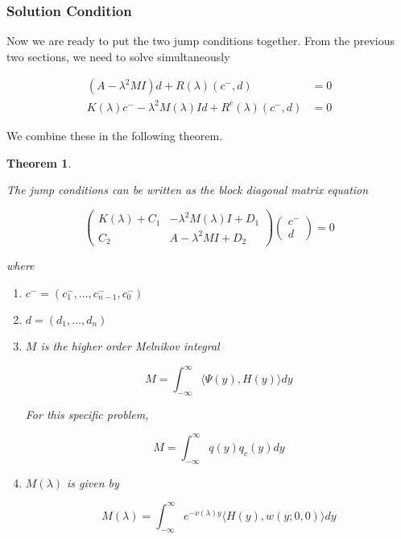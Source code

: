 \documentclass[12pt]{article}
\newtheorem{theorem}{Theorem}
\begin{document}
\subsubsection{Solution Condition}

Now we are ready to put the two jump conditions together. From the previous two sections, we need to solve simultaneously

\begin{align*}
(A - \lambda^2 MI)d + R(\lambda)(c^-,d) &= 0 \\
K(\lambda)c^- -\lambda^2 M(\lambda) I d + R^c(\lambda)(c^-,d) &= 0
\end{align*}

We combine these in the following theorem.

\begin{theorem}\label{blockmatrixform}

The jump conditions can be written as the block diagonal matrix equation 

\begin{equation}
\begin{pmatrix}
K(\lambda) + C_1 & -\lambda^2 M(\lambda) I + D_1 \\
C_2 & A - \lambda^2 MI + D_2
\end{pmatrix}
\begin{pmatrix}c^- \\ d \end{pmatrix} = 0
\end{equation}

where 

\begin{enumerate}
\item $c^- = (c_1^-, \dots, c_{n-1}^-, c_0^-)$
\item $d = (d_1, \dots, d_n)$
\item $M$ is the higher order Melnikov integral

\begin{equation}
M =  \int_{-\infty}^\infty \langle \Psi(y), H(y) \rangle dy
\end{equation}

For this specific problem,

\begin{equation*}
M =  \int_{-\infty}^\infty q(y) q_c(y) dy
\end{equation*}

\item $M(\lambda)$ is given by

\begin{equation}
M(\lambda) = \int_{-\infty}^\infty e^{-\nu(\lambda)y} \langle H(y), w(y; 0, 0) \rangle dy
\end{equation}


\end{enumerate}
\end{theorem}
\end{document}
